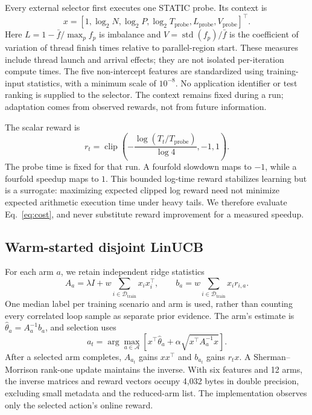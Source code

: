 \documentclass[10pt,letterpaper]{article}
\begin{document}
Every external selector first executes one STATIC probe. Its context is
\begin{equation}
 x=\left[1,\log_2N,\log_2P,\log_2T_{\mathrm{probe}},
             L_{\mathrm{probe}},V_{\mathrm{probe}}\right]^\top.
\end{equation}
Here $L=1-\bar f/\max_p f_p$ is imbalance and
$V=\operatorname{std}(f_p)/\bar f$ is the coefficient of variation of thread
finish times relative to parallel-region start. These measures include thread
launch and arrival effects; they are not isolated per-iteration compute times.
The five non-intercept features are standardized using training-input
statistics, with a minimum scale of $10^{-8}$. No application identifier or test
ranking is supplied to the selector. The context remains fixed during a run;
adaptation comes from observed rewards, not from future information.

The scalar reward is
\begin{equation}
 r_t=\operatorname{clip}\left(
 -\frac{\log(T_t/T_{\mathrm{probe}})}{\log4},-1,1\right).
 \label{eq:reward}
\end{equation}
The probe time is fixed for that run. A fourfold slowdown maps to $-1$, while
a fourfold speedup maps to $1$. This bounded log-time reward stabilizes
learning but is a surrogate: maximizing expected clipped log reward need not
minimize expected arithmetic execution time under heavy tails. We therefore
evaluate Eq.~\ref{eq:cost}, and never substitute reward improvement for a
measured speedup.

\subsection{Warm-started disjoint LinUCB}

For each arm $a$, we retain independent ridge statistics
\begin{equation}
 A_a=\lambda I+w\sum_{i\in\mathcal{D}_{\mathrm{train}}}x_ix_i^\top,
 \qquad b_a=w\sum_{i\in\mathcal{D}_{\mathrm{train}}}x_i r_{i,a}.
 \label{eq:init}
\end{equation}
One median label per training scenario and arm is used, rather than counting
every correlated loop sample as separate prior evidence. The arm's estimate
is $\hat\theta_a=A_a^{-1}b_a$, and selection uses
\begin{equation}
 a_t=\arg\max_{a\in\mathcal{A}}
 \left[x^\top\hat\theta_a+\alpha\sqrt{x^\top A_a^{-1}x}\right].
 \label{eq:ucb}
\end{equation}
After a selected arm completes, $A_{a_t}$ gains $xx^\top$ and $b_{a_t}$ gains
$r_tx$. A Sherman--Morrison rank-one update maintains the inverse. With six
features and 12 arms, the inverse matrices and reward vectors occupy 4,032
bytes in double precision, excluding small metadata and the reduced-arm list.
The implementation observes only the selected action's online reward.
\end{document}
